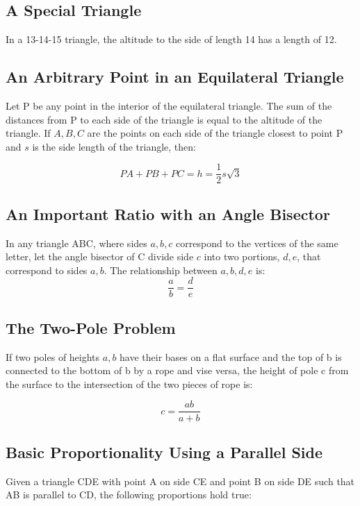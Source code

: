 \documentclass[draft, letterpaper, 12pt]{article}
\begin{document}
	\subsection{A Special Triangle}\label{sec: special triangle situation}
		In a 13-14-15 triangle, the altitude to the side of length 14 has a length of 12.
	
	\subsection{An Arbitrary Point in an Equilateral Triangle}\label{sec: properties of a point inside an equilateral triangle}
		Let P be any point in the interior of the equilateral triangle. The sum of the distances from P to each side of the triangle is equal to the altitude of the triangle. If $A, B, C$ are the points on each side of the triangle closest to point P and $s$ is the side length of the triangle, then:
		
		\begin{equation}
			PA + PB + PC = h = \frac{1}{2}s\sqrt{3}
		\end{equation}
	
	\subsection{An Important Ratio with an Angle Bisector}\label{sec: a ratio concerning an angle bisector in a triangle}
		In any triangle ABC, where sides $a, b, c$ correspond to the vertices of the same letter, let the angle bisector of C divide side $c$ into two portions, $d, e$, that correspond to sides $a, b$. The relationship between $a, b, d, e$ is:
		\begin{equation}
			\frac{a}{b} = \frac{d}{e}
		\end{equation}
	
	\subsection{The Two-Pole Problem}\label{sec: two poles connected to the base of the other pole}
		If two poles of heights $a, b$ have their bases on a flat surface and the top of b is connected to the bottom of b by a rope and vise versa, the height of pole c from the surface to the intersection of the two pieces of rope is:
		
		\begin{equation}
			c = \frac{ab}{a+b}
		\end{equation}
	
	\subsection{Basic Proportionality Using a Parallel Side}\label{sec: proportionality with a parallel intersection in a triangle}
		Given a triangle CDE with point A on side CE and point B on side DE such that AB is parallel to CD, the following proportions hold true:
		
\end{document}
